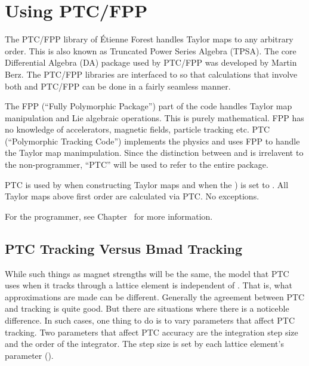 \chapter{Using PTC/FPP}
\label{c:ptc.use}


The PTC/FPP library of \'Etienne Forest handles Taylor maps to any arbitrary order. This is also
known as Truncated Power Series Algebra (TPSA). The core Differential Algebra (DA) package used by
PTC/FPP was developed by Martin Berz\cite{b:berz}. The PTC/FPP libraries are interfaced to \bmad so
that calculations that involve both \bmad and PTC/FPP can be done in a fairly seamless manner.

The FPP (``Fully Polymorphic Package'') part of the code handles Taylor map manipulation
and Lie algebraic operations. This is purely mathematical. FPP has no knowledge of accelerators,
magnetic fields, particle tracking etc. PTC (``Polymorphic Tracking Code'') implements the physics
and uses FPP to handle the Taylor map manimpulation. Since the distinction between  and
 is irrelavent to the non-programmer, ``PTC'' will be used to refer to the entire package.

PTC is used by \bmad when constructing Taylor maps and when the 
) is set to . All Taylor maps above first order are calculated
via PTC. No exceptions.

For the programmer, see Chapter~ for more information.

\section{PTC Tracking Versus Bmad Tracking}
\label{s:ptc.bmad.track}

While such things as magnet strengths will be the same, the model that PTC uses when it tracks
through a lattice element is independent of \bmad. That is, what approximations are made can be
different. Generally the agreement between PTC and \bmad tracking is quite good. But there are
situations where there is a noticeble difference. In such cases, one thing to do is to vary
parameters that affect PTC tracking. Two parameters that affect PTC accuracy are the integration
step size and the order of the integrator. The step size is set by each lattice element's 
parameter (). 


